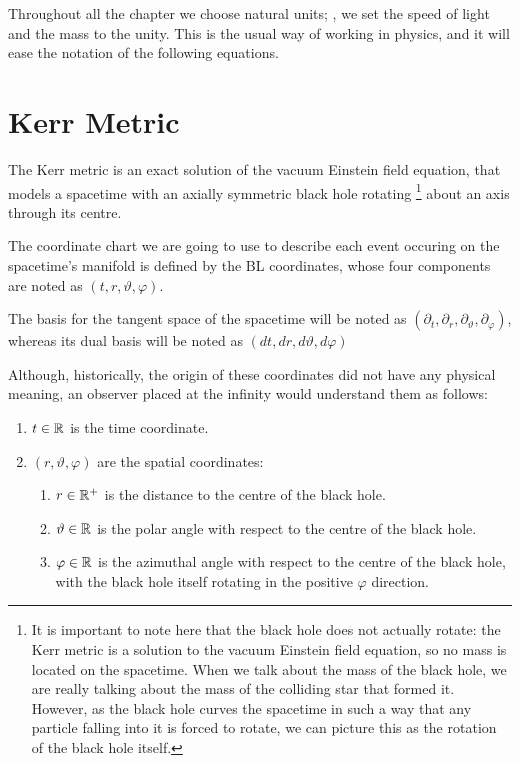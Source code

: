 Throughout all the chapter we choose natural units; \ie, we set the speed of light and the mass to the unity. This is the usual way of working in physics, and it will ease the notation of the following equations.

\section{Kerr Metric}

The Kerr metric is an exact solution of the vacuum Einstein field equation, that models a spacetime with an axially symmetric black hole rotating \footnote{It is important to note here that the black hole does not actually rotate: the Kerr metric is a solution to the vacuum Einstein field equation, so no mass is located on the spacetime. When we talk about the mass of the black hole, we are really talking about the mass of the colliding star that formed it. However, as the black hole curves the spacetime in such a way that any particle falling into it is forced to rotate, we can picture this as the rotation of the black hole itself.} about an axis through its centre.

The coordinate chart we are going to use to describe each event occuring on the spacetime's manifold is defined by the \ac{BL} coordinates, whose four components are noted as $(t, r, \vartheta, \varphi)$.

The basis for the tangent space of the spacetime will be noted as $(\partial_t, \partial_r, \partial_\vartheta, \partial_\varphi)$, whereas its dual basis will be noted as $(dt, dr, d\vartheta, d\varphi)$

Although, historically, the origin of these coordinates did not have any physical meaning, an observer placed at the infinity would understand them as follows:
\begin{enumerate}
	\item $t\in\mathbb{R}$ is the time coordinate.
	\item $(r, \vartheta, \varphi)$ are the spatial coordinates:
	\begin{enumerate}
		\item $r \in \mathbb{R}^+$ is the distance to the centre of the black hole.
		\item $\vartheta \in \mathbb{R}$ is the polar angle with respect to the centre of the black hole.
		\item $\varphi \in \mathbb{R}$ is the azimuthal angle with respect to the centre of the black hole, with the black hole itself rotating in the positive $\varphi$ direction.
	\end{enumerate}
\end{enumerate}

